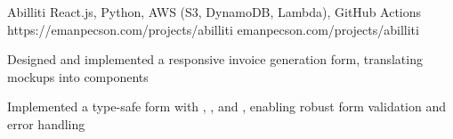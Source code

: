 
\projheader
{Abilliti}
{React.js, Python, AWS (S3, DynamoDB, Lambda), GitHub Actions}
{https://emanpecson.com/projects/abilliti}
{emanpecson.com/projects/abilliti}

\begin{bullets}

	\item Designed and implemented a responsive invoice generation form, translating  mockups into  components

	\item Implemented a type-safe form with , , and , enabling robust form validation and error handling

\end{bullets}
